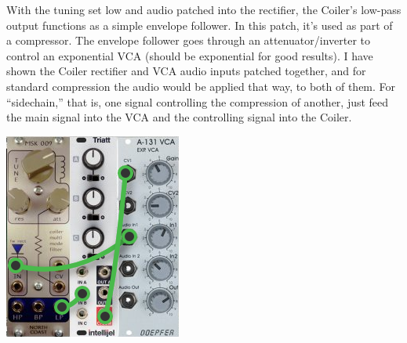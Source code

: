 \pagebreak

With the tuning set low and audio patched into the rectifier, the Coiler's
low-pass output functions as a simple envelope follower.  In this patch,
it's used as part of a compressor.  The envelope follower goes through an
attenuator/inverter to control an exponential VCA (should be exponential
for good results).  I have shown the Coiler rectifier and VCA audio inputs
patched together, and for standard compression the audio would be applied
that way, to both of them.  For ``sidechain,'' that is, one signal
controlling the compression of another, just feed the main signal into the
VCA and the controlling signal into the Coiler.

\nopagebreak\noindent
{\hspace*{\fill}\includegraphics[scale=1.8]{patch6.png}\hspace*{\fill}\par} 
